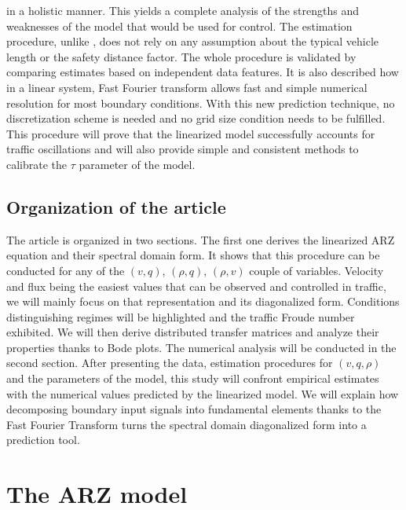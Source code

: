 \documentclass[preprint]{elsarticle}
\begin{document}
in a holistic manner. This yields a complete analysis of the strengths
and weaknesses of the model that would be used for control. The estimation
procedure, unlike \cite{Fan},
does not rely on any assumption about the typical vehicle length or
the safety distance factor. The whole procedure is validated by comparing estimates based on independent data features. It is also described how in a linear system, Fast Fourier
transform allows fast and simple numerical resolution for most boundary
conditions. With this new prediction technique, no discretization
scheme is needed and no grid size condition needs to be fulfilled.
This procedure will prove that the linearized model successfully accounts
for traffic oscillations and will also provide simple and consistent
methods to calibrate the $\tau$ parameter of the model.\

\subsection{Organization of the article}
The article is organized in two sections. The first one derives the
linearized ARZ equation and their spectral domain form. It shows that
this procedure can be conducted for any of the $\left(v,q\right)$,
$\left(\rho,q\right)$, $\left(\rho,v\right)$ couple of variables.
Velocity and flux being the easiest values that can be observed and
controlled in traffic, we will mainly focus on that representation
and its diagonalized form. Conditions distinguishing regimes will
be highlighted and the traffic Froude number exhibited. We will then
derive distributed transfer matrices and analyze their properties
thanks to Bode plots. The numerical analysis will be conducted in
the second section. After presenting the data, estimation procedures
for $\left(v,q,\rho\right)$ and the parameters of the model, this
study will confront empirical estimates with the numerical values
predicted by the linearized model. We will explain how decomposing
boundary input signals into fundamental elements thanks to the Fast
Fourier Transform turns the spectral domain diagonalized form into
a prediction tool.


\section{The ARZ model}

\end{document}

